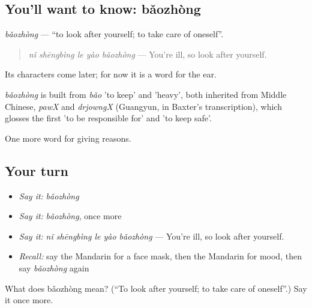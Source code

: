 \subsection*{You'll want to know: bǎozhòng}
\emph{bǎozhòng} — \textquotedblleft{}to look after yourself; to take care of oneself\textquotedblright{}.

\begin{quote}
\emph{nǐ shēngbìng le yào bǎozhòng} — You're ill, so look after yourself.
\end{quote}

Its characters come later; for now it is a word for the ear.

\begin{cousinweb}
\emph{bǎozhòng} is built from \emph{bǎo} 'to keep' and  'heavy', both inherited from Middle Chinese, \emph{pawX} and \emph{drjowngX} (Guangyun, in Baxter's transcription), which glosses the first 'to be responsible for' and 'to keep safe'.
\end{cousinweb}

\begin{grammarlens}[title={What you've built}]
One more word for giving reasons.
\end{grammarlens}

\subsection*{Your turn}
\begin{itemize}
\raggedright
  \item \emph{Say it:} \emph{bǎozhòng}
  \item \emph{Say it:} \emph{bǎozhòng}, once more
  \item \emph{Say it:} \emph{nǐ shēngbìng le yào bǎozhòng} — You're ill, so look after yourself.
  \item \emph{Recall:} say the Mandarin for a face mask, then the Mandarin for mood, then say \emph{bǎozhòng} again
\end{itemize}

\begin{tcolorbox}[breakable,colback=teal!4,colframe=teal!35!black,title={Before you move on}]
What does bǎozhòng mean? (\textquotedblleft{}To look after yourself; to take care of oneself\textquotedblright{}.) Say it once more.
\end{tcolorbox}
